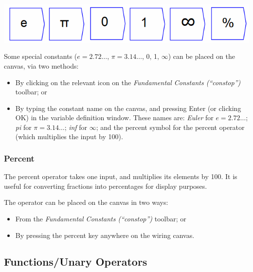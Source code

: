 \label{Special-constants}\label{operations-constop}

\includegraphics{images/FundamentalConstants}

\label{Operation:euler}\label{Operation:pi}\label{Operation:zero}\label{Operation:one}
\label{Operation:inf}

Some special constants ($e=2.72\ldots$, $\pi=3.14\ldots$, 0, 1,
$\infty$) can be placed on the canvas, via two methods:
\begin{itemize}
\item By clicking on the relevant icon on the \emph{Fundamental Constants
(``constop'')} toolbar; or 
\item By typing the constant name on the canvas, and pressing Enter (or
clicking OK) in the variable definition window. These names are: \textit{Euler}
for $e=2.72\ldots$; \textit{pi} for $\pi=3.14\ldots$; \textit{inf}
for $\infty$; and the percent symbol for the percent operator (which
multiplies the input by 100).
\end{itemize}

\subsubsection{Percent}


\label{Operation:percent} The percent operator takes one input, and
multiplies its elements by 100. It is useful for converting fractions
into percentages for display purposes.

The operator can be placed on the canvas in two ways:
\begin{itemize}
\item From the \emph{Fundamental Constants (``constop'')} toolbar; or 
\item By pressing the percent key anywhere on the wiring canvas. 
\end{itemize}

\subsection{Functions/Unary Operators}

\label{Functions/Unary-Operators}\label{operations-function}

